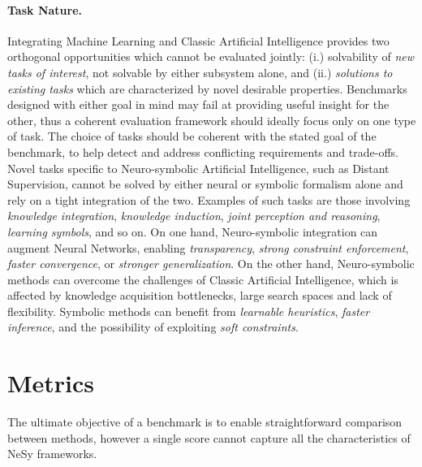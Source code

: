 \paragraph{Task Nature.} Integrating Machine Learning and Classic Artificial Intelligence provides two orthogonal opportunities which cannot be evaluated jointly: (i.) solvability of \textit{new tasks of interest}, not solvable by either subsystem alone, and (ii.) \textit{solutions to existing tasks} which are characterized by novel desirable properties.
Benchmarks designed with either goal in mind may fail at providing useful insight for the other, thus a coherent evaluation framework should ideally focus only on one type of task.
The choice of tasks should be coherent with the stated goal of the benchmark, to help detect and address conflicting requirements and trade-offs. %
%
Novel tasks specific to Neuro-symbolic Artificial Intelligence, such as Distant Supervision, cannot be solved by either neural or symbolic formalism alone and rely on a tight integration of the two. Examples of such tasks are those involving \textit{knowledge integration}, \textit{knowledge induction}, \textit{joint perception and reasoning}, \textit{learning symbols}, and so on.
On one hand, Neuro-symbolic integration can augment Neural Networks, enabling \textit{transparency}, \textit{strong constraint enforcement}, \textit{faster convergence}, or \textit{stronger generalization}.
On the other hand, Neuro-symbolic methods can overcome the challenges of Classic Artificial Intelligence, which is affected by knowledge acquisition bottlenecks, large search spaces and lack of flexibility. Symbolic methods can benefit from \textit{learnable heuristics}, \textit{faster inference}, and the possibility of exploiting \textit{soft constraints}.

\section{Metrics}
The ultimate objective of a benchmark is to enable straightforward comparison between methods, however a single score cannot capture all the characteristics of NeSy frameworks.

